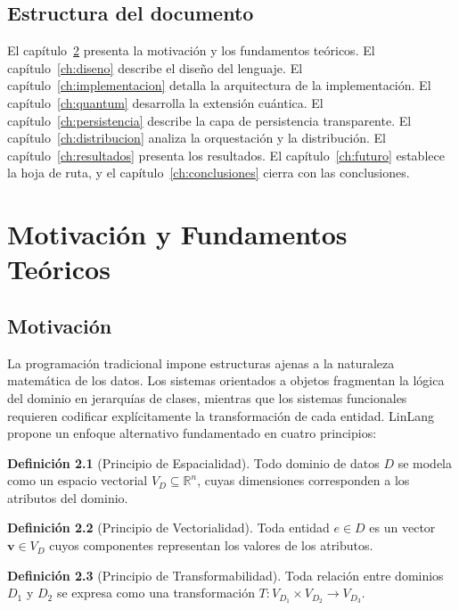 \documentclass[12pt, a4paper, openany]{report}
\theoremstyle{definition}
\newtheorem{definition}{Definición}[chapter]
\begin{document}
\section{Estructura del documento}

El capítulo~\ref{ch:motivacion} presenta la motivación y los fundamentos teóricos. El capítulo~\ref{ch:diseno} describe el diseño del lenguaje. El capítulo~\ref{ch:implementacion} detalla la arquitectura de la implementación. El capítulo~\ref{ch:quantum} desarrolla la extensión cuántica. El capítulo~\ref{ch:persistencia} describe la capa de persistencia transparente. El capítulo~\ref{ch:distribucion} analiza la orquestación y la distribución. El capítulo~\ref{ch:resultados} presenta los resultados. El capítulo~\ref{ch:futuro} establece la hoja de ruta, y el capítulo~\ref{ch:conclusiones} cierra con las conclusiones.

\chapter{Motivación y Fundamentos Teóricos}
\label{ch:motivacion}

\section{Motivación}

La programación tradicional impone estructuras ajenas a la naturaleza matemática de los datos. Los sistemas orientados a objetos fragmentan la lógica del dominio en jerarquías de clases, mientras que los sistemas funcionales requieren codificar explícitamente la transformación de cada entidad. LinLang propone un enfoque alternativo fundamentado en cuatro principios:

\begin{definition}[Principio de Espacialidad]
Todo dominio de datos $D$ se modela como un espacio vectorial $V_D \subseteq \mathbb{R}^n$, cuyas dimensiones corresponden a los atributos del dominio.
\end{definition}

\begin{definition}[Principio de Vectorialidad]
Toda entidad $e \in D$ es un vector $\bm{v} \in V_D$ cuyos componentes representan los valores de los atributos.
\end{definition}

\begin{definition}[Principio de Transformabilidad]
Toda relación entre dominios $D_1$ y $D_2$ se expresa como una transformación $T: V_{D_1} \times V_{D_2} \to V_{D_3}$.
\end{definition}
\end{document}
